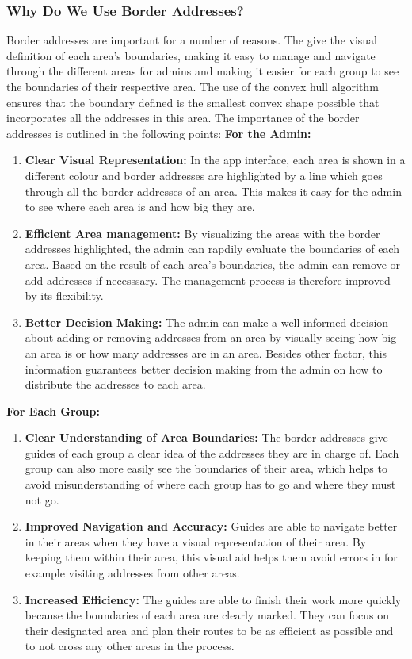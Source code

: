     \subsubsection{Why Do We Use Border Addresses?}
    Border addresses are important for a number of reasons. The give the visual definition of each area's boundaries, making it easy to manage and navigate through the different areas for admins and making it easier for each group to see the boundaries of their respective area. The use of the convex hull algorithm ensures that the boundary defined is the smallest convex shape possible that incorporates all the addresses in this area. The importance of the border addresses is outlined in the following points: \newline \newline
    \textbf{For the Admin:}
    \begin{enumerate}
        \item \textbf{Clear Visual Representation:} In the app interface, each area is shown in a different colour and border addresses are highlighted by a line which goes through all the border addresses of an area. This makes it easy for the admin to see where each area is and how big they are.
        \item \textbf{Efficient Area management:} By visualizing the areas with the border addresses highlighted, the admin can rapdily evaluate the boundaries of each area. Based on the result of each area's boundaries, the admin can remove or add addresses if necesssary. The management process is therefore improved by its flexibility. 
        \item \textbf{Better Decision Making:} The admin can make a well-informed decision about adding or removing addresses from an area by visually seeing how big an area is or how many addresses are in an area. Besides other factor, this information guarantees better decision making from the admin on how to distribute the addresses to each area.
    \end{enumerate}

    \textbf{For Each Group:}
    \begin{enumerate}
        \item \textbf{Clear Understanding of Area Boundaries:} The border addresses give guides of each group a clear idea of the addresses they are in charge of. Each group can also more easily see the boundaries of their area, which helps to avoid misunderstanding of where each group has to go and where they must not go.
        \item \textbf{Improved Navigation and Accuracy:} Guides are able to navigate better in their areas when they have a visual representation of their area. By keeping them within their area, this visual aid helps them avoid errors in for example visiting addresses from other areas. 
        \item \textbf{Increased Efficiency:} The guides are able to finish their work more quickly because the boundaries of each area are clearly marked. They can focus on their designated area and plan their routes to be as efficient as possible and to not cross any other areas in the process.
    \end{enumerate}

